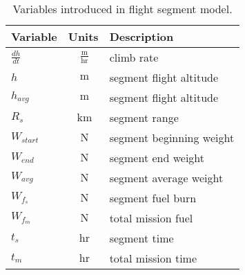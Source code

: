 \begin{footnotesize}
    \begin{table}
        \centering
        \begin{tabular}{l c l}
            \toprule
            Variable & Units & Description \\
            \midrule
            $\frac{dh}{dt}$  & $~\mathrm{\tfrac{m}{hr}}$ & climb rate \\
            $h$ & $~\mathrm{m}$ & segment flight altitude\\
            $h_{avg}$ & $~\mathrm{m}$ & segment flight altitude\\
            $R_s$ & $~\mathrm{km}$ & segment range\\
            $W_{start}$  & $~\mathrm{N}$ & segment beginning weight\\
            $W_{end}$ & $~\mathrm{N}$ & segment end weight\\
            $W_{avg}$ & $~\mathrm{N}$ & segment average weight\\
            $W_{f_s}$ & $~\mathrm{N}$ & segment fuel burn\\
            $W_{f_m}$  & $~\mathrm{N}$ & total mission fuel\\
            $t_s$ & $~\mathrm{hr}$ & segment time\\
            $t_m$  & $~\mathrm{hr}$ & total mission time\\
            \bottomrule
        \end{tabular}
        \caption{Variables introduced in flight segment model.}
        \label{t:vars_flightprofile}
    \end{table}
\end{footnotesize}
